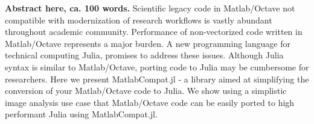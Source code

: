 \textbf{Abstract here, ca. 100 words.}
Scientific legacy code in Matlab/Octave not compatible with modernization of research workflows is vastly abundant throughout academic community. Performance of non-vectorized code written in Matlab/Octave represents a major burden. A new programming language for technical computing Julia, promises to address these issues. Although Julia syntax is similar to Matlab/Octave, porting code to Julia may be cumbersome for researchers. Here we present MatlabCompat.jl - a library aimed at simplifying the conversion of your Matlab/Octave code to Julia. We show using a simplistic image analysis use case that Matlab/Octave code can be easily ported to high performant Julia using MatlabCompat.jl.
  
  